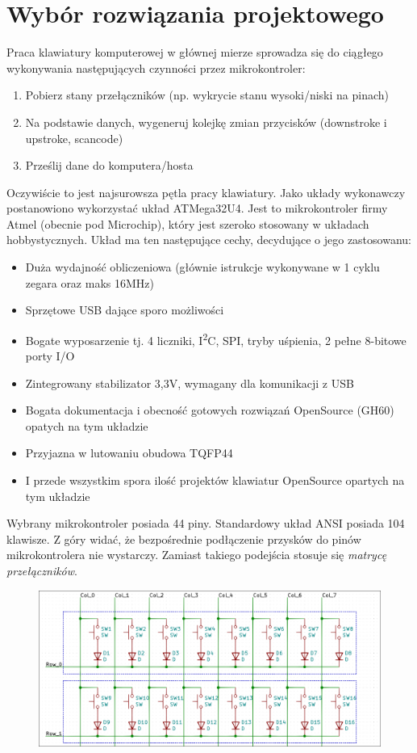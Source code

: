 \documentclass{article}
\begin{document}
    \section{Wybór rozwiązania projektowego}
    Praca klawiatury komputerowej w głównej mierze sprowadza się do ciągłego wykonywania następujących
    czynności przez mikrokontroler:
    \begin{enumerate}
        \item Pobierz stany przełączników (np. wykrycie stanu wysoki/niski na pinach)
        \item Na podstawie danych, wygeneruj kolejkę zmian przycisków (downstroke i upstroke, scancode)
        \item Prześlij dane do komputera/hosta
    \end{enumerate}
    Oczywiście to jest najsurowsza pętla pracy klawiatury. Jako układy wykonawczy postanowiono wykorzystać
    układ ATMega32U4. Jest to mikrokontroler firmy Atmel (obecnie pod Microchip), który jest szeroko stosowany
    w układach hobbystycznych. Układ ma ten następujące cechy, decydujące o jego zastosowanu:
    \begin{itemize}
        \item Duża wydajność obliczeniowa (głównie istrukcje wykonywane w 1 cyklu zegara oraz maks 16MHz)
        \item Sprzętowe USB dające sporo możliwości
        \item Bogate wyposarzenie tj. 4 liczniki,  I\textsuperscript{2}C, SPI, tryby uśpienia, 2 pełne 8-bitowe porty I/O
        \item Zintegrowany stabilizator 3,3V, wymagany dla komunikacji z USB
        \item Bogata dokumentacja i obecność gotowych rozwiązań OpenSource (GH60) opatych na tym układzie
        \item Przyjazna w lutowaniu obudowa TQFP44
        \item I przede wszystkim spora ilość projektów klawiatur OpenSource opartych na tym układzie
    \end{itemize}
    Wybrany mikrokontroler posiada 44 piny. Standardowy układ ANSI posiada 104 klawisze. Z góry widać, że bezpośrednie
    podłączenie przysków do pinów mikrokontrolera nie wystarczy. Zamiast takiego podejścia stosuje się \emph{matrycę przełączników}.
    \newpage
    \begin{figure}
        \centering
        \includegraphics[width=\textwidth]{1}
    \end{figure}
\end{document}
